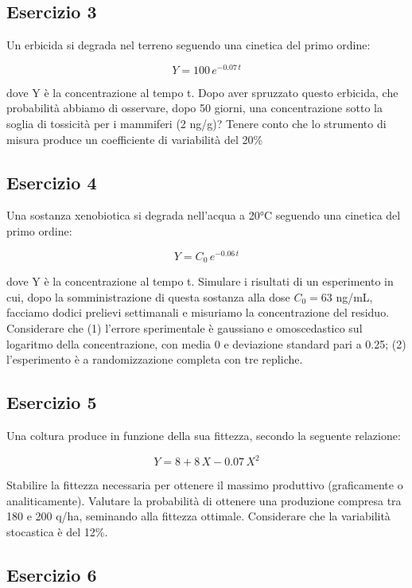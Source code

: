 \documentclass[a4paper,12pt,oneside]{book}
\begin{document}
\hypertarget{esercizio-3-1}{%
\subsection{Esercizio 3}\label{esercizio-3-1}}

Un erbicida si degrada nel terreno seguendo una cinetica del primo ordine:

\[Y = 100 \, e^{-0.07 \, t}\]

dove Y è la concentrazione al tempo t. Dopo aver spruzzato questo erbicida, che probabilità abbiamo di osservare, dopo 50 giorni, una concentrazione sotto la soglia di tossicità per i mammiferi (2 ng/g)? Tenere conto che lo strumento di misura produce un coefficiente di variabilità del 20\%

\hypertarget{esercizio-4}{%
\subsection{Esercizio 4}\label{esercizio-4}}

Una sostanza xenobiotica si degrada nell'acqua a 20°C seguendo una cinetica del primo ordine:

\[Y = C_0 \, e^{-0.06 \, t}\]

dove Y è la concentrazione al tempo t. Simulare i risultati di un esperimento in cui, dopo la somministrazione di questa sostanza alla dose \(C_0 = 63\) ng/mL, facciamo dodici prelievi settimanali e misuriamo la concentrazione del residuo. Considerare che (1) l'errore sperimentale è gaussiano e omoscedastico sul logaritmo della concentrazione, con media 0 e deviazione standard pari a 0.25; (2) l'esperimento è a randomizzazione completa con tre repliche.

\hypertarget{esercizio-5}{%
\subsection{Esercizio 5}\label{esercizio-5}}

Una coltura produce in funzione della sua fittezza, secondo la seguente relazione:

\[ Y = 8 + 8 \, X - 0.07 \, X^2\]

Stabilire la fittezza necessaria per ottenere il massimo produttivo (graficamente o analiticamente). Valutare la probabilità di ottenere una produzione compresa tra 180 e 200 q/ha, seminando alla fittezza ottimale. Considerare che la variabilità stocastica è del 12\%.

\hypertarget{esercizio-6}{%
\subsection{Esercizio 6}\label{esercizio-6}}
\end{document}
